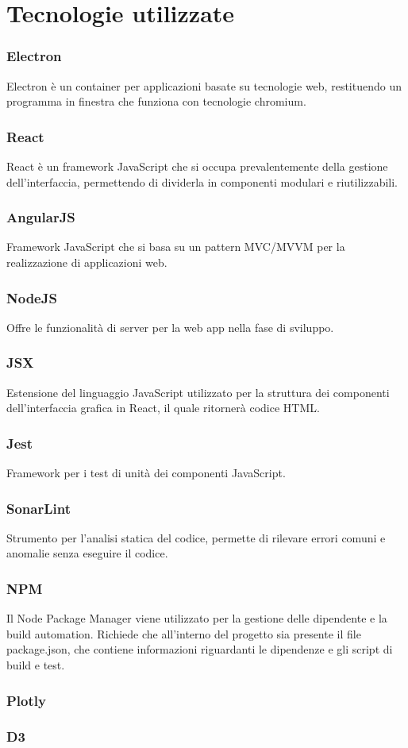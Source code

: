 \section{Tecnologie utilizzate}
	\subsubsection{Electron}
		Electron è un container per applicazioni basate su tecnologie web, restituendo un programma in finestra che funziona con tecnologie chromium.
	\subsubsection{React}
		React è un framework JavaScript che si occupa prevalentemente della gestione dell'interfaccia, permettendo di dividerla in componenti modulari e riutilizzabili.
	\subsubsection{AngularJS}
		Framework JavaScript che si basa su un pattern MVC/MVVM per la realizzazione di applicazioni web.
	\subsubsection{NodeJS}
		Offre le funzionalità di server per la web app nella fase di sviluppo.
	\subsubsection{JSX}
		Estensione del linguaggio JavaScript utilizzato per la struttura dei componenti dell'interfaccia grafica in React, il quale ritornerà codice HTML.
	\subsubsection{Jest}
		Framework per i test di unità dei componenti JavaScript.
	\subsubsection{SonarLint}
		Strumento per l'analisi statica del codice, permette di rilevare errori comuni e anomalie senza eseguire il codice.
	\subsubsection{NPM}
		Il Node Package Manager viene utilizzato per la gestione delle dipendente e la build automation.
		Richiede che all'interno del progetto sia presente il file package.json, che contiene informazioni riguardanti le dipendenze e gli script di build e test.
	\subsubsection{Plotly}
	\subsubsection{D3}
	\subsubsection{}
	\subsubsection{}
	\subsubsection{}


